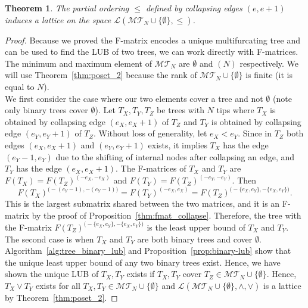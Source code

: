\documentclass{article}
\newtheorem{theorem}{Theorem}
\begin{document}
\begin{theorem}\label{thm:tree_lattice}
The partial ordering $\leq $ defined by collapsing edges $(e,e+1)$ induces a lattice on the space $\mathcal{L}(\mathcal{MT}_N\cup \{\emptyset\}, \leq  )$. 
\end{theorem}
\begin{proof}
Because we proved the F-matrix encodes a unique multifurcating tree and can be used to find the LUB of two trees, we can work directly with F-matrices. The minimum and maximum element of $\mathcal{MT}_N$ are $\emptyset$ and $(N)$ respectively. We will use Theorem~\ref{thm:poset_2} because the rank of $\mathcal{MT}_N \cup \{\emptyset\}$ is finite (it is equal to $N$). \\

\noindent We first consider the case where our two elements cover a tree and not $\emptyset$ (note only binary trees cover $\emptyset$). Let $T_X, T_Y, T_Z$ be trees with $N$ tips where $T_X$ is obtained by collapsing edge $(e_X, e_X+1)$ of $T_Z$ and $T_Y$ is obtained by collapsing edge $(e_Y, e_Y+1)$ of $T_Z$. Without loss of generality, let $e_X < e_Y$. Since in $T_Z$ both edges $(e_X, e_X+1)$ and $(e_Y, e_Y+1)$ exists, it implies $T_X$ has the edge $(e_Y-1, e_Y)$ due to the shifting of internal nodes after collapsing an edge, and $T_Y$ has the edge $(e_X, e_X+1)$. The F-matrices of $T_X$ and $T_Y$ are $F(T_X)=F(T_Z)^{( -e_X, -e_X  )}$ and $F(T_Y)=F(T_Z)^{ ( -e_Y, -e_Y )}$. Then \[ F(T_X)^{\big ( -(e_Y-1),-( e_Y-1)\big)} = F(T_Y) ^{( -e_X, e_X)}= F(T_Z)^{\big ( -\{e_X, e_Y\}, -\{e_X, e_Y\} \big)}. \]
This is the largest submatrix shared between the two matrices, and it is an F-matrix by the proof of Proposition~\ref{thm:fmat_collapse}. 
Therefore, the tree with the F-matrix $F(T_Z)^{\big( -\{e_X, e_Y\}, -\{e_X, e_Y\} \big) }$ is the least upper bound of $T_X$ and $T_Y$. \\

\noindent The second case is when $T_X$ and $T_Y$ are both binary trees and cover $\emptyset$. Algorithm~\ref{alg:tree_binary_lub} and Proposition~\ref{prop:binary-lub} show that the unique least upper bound of any two binary trees exist. Hence, we have shown the unique LUB of $T_X, T_Y$ exists if $T_X, T_Y$ cover $T_Z \in \mathcal{MT}_N\cup \{\emptyset\}$. Hence, $T_X \vee T_Y$ exists for all $T_X, T_Y \in \mathcal{MT}_N\cup \{\emptyset\}$ and $\mathcal{L}(\mathcal{MT}_N\cup \{\emptyset\}, \wedge, \vee)$ is a lattice by Theorem~\ref{thm:poset_2}.
\end{proof}
\end{document}
